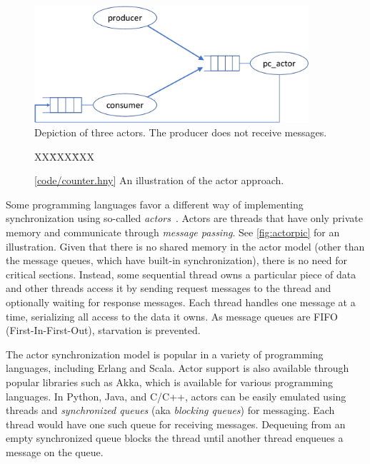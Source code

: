 \documentclass{report}
\newcommand{\harmonysource}[1]{
\begin{tabbing}
XX\=XXX\=XXX\kill
    
\end{tabbing}
}
\newcommand{\harmonylink}[1]{%
[\href{https://harmony.cs.cornell.edu/#1}{\underline{#1}}]%
}
\newenvironment{code}{
\tcolorbox
}{
\endtcolorbox
}
\begin{document}
\begin{figure}
\begin{center}
\includegraphics[width=4in]{figures/actor-crop.pdf}
\end{center}
\caption{Depiction of three actors.  The producer does not receive messages.}
\label{fig:actorpic}
\end{figure}

\begin{figure}
\begin{code}
\harmonysource{counter}
\end{code}
\caption{\harmonylink{code/counter.hny} An illustration of the actor approach.}
\label{fig:actor}
\end{figure}

Some programming languages favor a different way of implementing
synchronization using so-called \emph{actors}~\cite{HBS73,Agha86}.  Actors are
threads that have only private memory and communicate through
\emph{message passing}.
See \autoref{fig:actorpic} for an illustration.
Given that there is no shared memory in the actor model (other than the message
queues, which have built-in synchronization), there is no need
for critical sections.  Instead, some sequential thread owns a particular
piece of data and other threads access it by sending request messages
to the thread and optionally waiting for response messages.  Each thread
handles one message at a time, serializing all access to the data it owns.
As message queues are FIFO (First-In-First-Out), starvation is prevented.

The actor synchronization model is popular in a variety of programming
languages, including Erlang and Scala.  Actor support is also available
through popular libraries such as Akka, which is available for various
programming languages.  In Python, Java, and C/C++,
actors can be easily emulated using threads and \emph{synchronized queues}
%
(aka \emph{blocking queues})
%
for messaging.
Each thread would have one such queue for receiving messages.
Dequeuing from an empty synchronized queue blocks the thread until
another thread enqueues a message on the queue.
\end{document}
